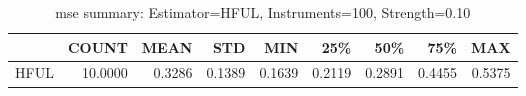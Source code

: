 \begin{table}[ht]
\centering
\caption{mse summary: Estimator=HFUL, Instruments=100, Strength=0.10}
\begin{tabular}{lrrrrrrrr}
\toprule
 & COUNT & MEAN & STD & MIN & 25\% & 50\% & 75\% & MAX \\
\midrule
HFUL & 10.0000 & 0.3286 & 0.1389 & 0.1639 & 0.2119 & 0.2891 & 0.4455 & 0.5375 \\
\bottomrule
\end{tabular}
\end{table}
